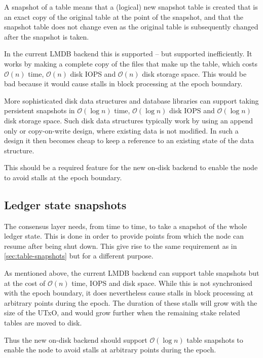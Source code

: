 \documentclass[11pt,a4paper]{article}
\begin{document}
A snapshot of a table means that a (logical) new snapshot table is created that
is an exact copy of the original table at the point of the snapshot, and that
the snapshot table does not change even as the original table is subsequently
changed after the snapshot is taken.

In the current LMDB backend this is supported -- but supported inefficiently.
It works by making a complete copy of the files that make up the table, which
costs $\mathcal{O}(n)$ time, $\mathcal{O}(n)$ disk IOPS and $\mathcal{O}(n)$
disk storage space. This would be bad because it would cause stalls in block
processing at the epoch boundary.

More sophisticated disk data structures and database libraries can support
taking persistent snapshots in $\mathcal{O}(\log n)$ time, $\mathcal{O}(\log n)$
disk IOPS and $\mathcal{O}(\log n)$ disk storage space. Such disk data
structures typically work by using an append only or copy-on-write design,
where existing data is not modified. In such a design it then becomes cheap to
keep a reference to an existing state of the data structure.

This should be a required feature for the new on-disk backend to enable the
node to avoid stalls at the epoch boundary.

\subsection{Ledger state snapshots}
\label{sec:ledger-state-snapshots}

The consensus layer needs, from time to time, to take a snapshot of the whole
ledger state. This is done in order to provide points from which the node can
resume after being shut down. This give rise to the same requirement as in
\cref{sec:table-snapshots} but for a different purpose.

As mentioned above, the current LMDB backend can support table snapshots but
at the cost of $\mathcal{O}(n)$ time, IOPS and disk space. While this is not
synchronised with the epoch boundary, it does nevertheless cause stalls in
block processing at arbitrary points during the epoch. The duration of these
stalls will grow with the size of the UTxO, and would grow further when the
remaining stake related tables are moved to disk.

Thus the new on-disk backend should support $\mathcal{O}(\log n)$ table
snapshots to enable the node to avoid stalls at arbitrary points during the
epoch.
\end{document}
